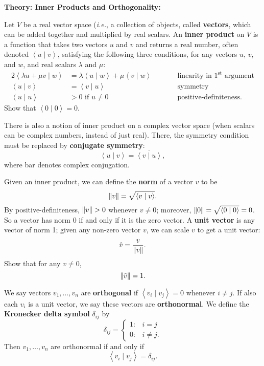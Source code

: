 \documentclass{article}
\newcommand{\norm}[1]{\left|\kern-1pt\left|#1\right|\kern-1pt\right|}
\newcommand{\braket}[2]{\left\langle #1 \mid #2 \right\rangle}
\begin{document}
\clearpage










\textbf{Theory: Inner Products and Orthogonality:}

\bigskip




Let $V$ be a real vector space (\textit{i.e.}, a collection of objects, called \textbf{vectors}, which can be added together and multiplied by real scalars. An \textbf{inner product} on $V$ is a function that takes two vectors $u$ and $v$ and returns a real number, often denoted $\braket{u}{v}$, satisfying the following three conditions, for any vectors $u$, $v$, and $w$, and real scalars $\lambda$ and $\mu$:
\begin{alignat*}{2}
	\braket{\lambda u + \mu v}{w} &= \lambda\braket{u}{w} + \mu\braket{v}{w}\qquad&& \mbox{linearity in $1^\mathrm{st}$ argument}\\
	\braket{u}{v} &= \braket{v}{u}\qquad&& \mbox{symmetry}\\
	\braket{u}{u} &> 0\mbox{ if $u\neq 0$}\qquad&& \mbox{positive-definiteness.}
\end{alignat*}
Show that $\braket{0}{0}=0$.\bigskip

There is also a notion of inner product on a complex vector space (when scalars can be complex numbers, instead of just real). There, the symmetry condition must be replaced by \textbf{conjugate symmetry}:
\[\braket{u}{v}=\overline{\braket{v}{u}},\]
where bar denotes complex conjugation.\bigskip


Given an inner product, we can define the \textbf{norm} of a vector $v$ to be
\[\norm{v}=\sqrt{\braket{v}{v}}.\]
By positive-definiteness, $\norm{v}>0$ whenever $v\neq 0$; moreover, $\norm{0}=\sqrt{\braket{0}{0}}=0$. So a vector has norm 0 if and only if it is the zero vector. A \textbf{unit vector} is any vector of norm 1; given any non-zero vector $v$, we can scale $v$ to get a unit vector:
\[\hat{v}=\frac{v}{\norm{v}}.\]
Show that for any $v\neq 0$,
\[\norm{\hat{v}}=1.\]
\bigskip

We say vectors $v_1,\hdots,v_n$ are \textbf{orthogonal} if $\braket{v_i}{v_j}=0$ whenever $i\neq j$. If also each $v_i$ is a unit vector, we say these vectors are \textbf{orthonormal}. We define the \textbf{Kronecker delta symbol} $\delta_{ij}$ by
\[\delta_{ij}=\begin{cases} 1: & i=j\\ 0: & i\neq j.\end{cases}\]
Then $v_1,\hdots,v_n$ are orthonormal if and only if
\[\braket{v_i}{v_j}=\delta_{ij}.\]
\end{document}
